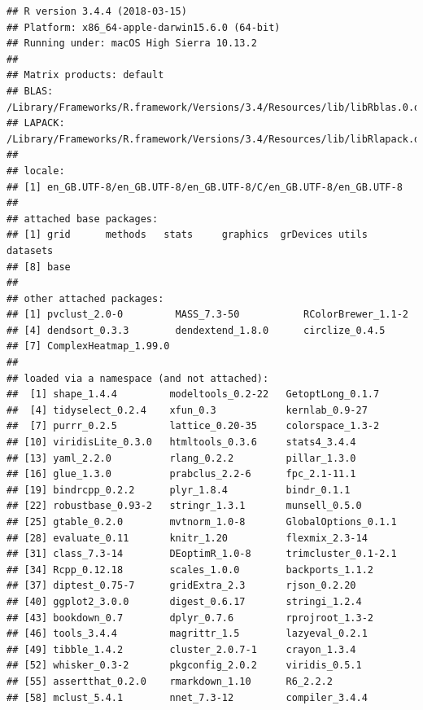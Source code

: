 \documentclass[]{book}
\theoremstyle{definition}
\theoremstyle{definition}
\theoremstyle{definition}
\theoremstyle{remark}
\begin{document}
\begin{verbatim}
## R version 3.4.4 (2018-03-15)
## Platform: x86_64-apple-darwin15.6.0 (64-bit)
## Running under: macOS High Sierra 10.13.2
## 
## Matrix products: default
## BLAS: /Library/Frameworks/R.framework/Versions/3.4/Resources/lib/libRblas.0.dylib
## LAPACK: /Library/Frameworks/R.framework/Versions/3.4/Resources/lib/libRlapack.dylib
## 
## locale:
## [1] en_GB.UTF-8/en_GB.UTF-8/en_GB.UTF-8/C/en_GB.UTF-8/en_GB.UTF-8
## 
## attached base packages:
## [1] grid      methods   stats     graphics  grDevices utils     datasets 
## [8] base     
## 
## other attached packages:
## [1] pvclust_2.0-0         MASS_7.3-50           RColorBrewer_1.1-2   
## [4] dendsort_0.3.3        dendextend_1.8.0      circlize_0.4.5       
## [7] ComplexHeatmap_1.99.0
## 
## loaded via a namespace (and not attached):
##  [1] shape_1.4.4         modeltools_0.2-22   GetoptLong_0.1.7   
##  [4] tidyselect_0.2.4    xfun_0.3            kernlab_0.9-27     
##  [7] purrr_0.2.5         lattice_0.20-35     colorspace_1.3-2   
## [10] viridisLite_0.3.0   htmltools_0.3.6     stats4_3.4.4       
## [13] yaml_2.2.0          rlang_0.2.2         pillar_1.3.0       
## [16] glue_1.3.0          prabclus_2.2-6      fpc_2.1-11.1       
## [19] bindrcpp_0.2.2      plyr_1.8.4          bindr_0.1.1        
## [22] robustbase_0.93-2   stringr_1.3.1       munsell_0.5.0      
## [25] gtable_0.2.0        mvtnorm_1.0-8       GlobalOptions_0.1.1
## [28] evaluate_0.11       knitr_1.20          flexmix_2.3-14     
## [31] class_7.3-14        DEoptimR_1.0-8      trimcluster_0.1-2.1
## [34] Rcpp_0.12.18        scales_1.0.0        backports_1.1.2    
## [37] diptest_0.75-7      gridExtra_2.3       rjson_0.2.20       
## [40] ggplot2_3.0.0       digest_0.6.17       stringi_1.2.4      
## [43] bookdown_0.7        dplyr_0.7.6         rprojroot_1.3-2    
## [46] tools_3.4.4         magrittr_1.5        lazyeval_0.2.1     
## [49] tibble_1.4.2        cluster_2.0.7-1     crayon_1.3.4       
## [52] whisker_0.3-2       pkgconfig_2.0.2     viridis_0.5.1      
## [55] assertthat_0.2.0    rmarkdown_1.10      R6_2.2.2           
## [58] mclust_5.4.1        nnet_7.3-12         compiler_3.4.4
\end{verbatim}


\end{document}
